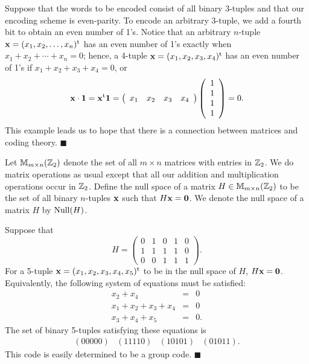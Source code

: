  
Suppose that the words to be encoded consist of all binary
\mbox{3-tuples}
and that our encoding scheme is even-parity. To encode an arbitrary
3-tuple, we add a fourth bit to obtain an even number of 1's. Notice
that an arbitrary $n$-tuple ${\bold x} = (x_1, x_2, \ldots, x_n)^{\rm
t}$ has an even number of 1's exactly when $x_1 + x_2 + \cdots + x_n =
0$; hence, a 4-tuple ${\bold x} = (x_1, x_2, x_3, x_4)^{\rm t}$ has an
even number of 1's if $ x_1+ x_2+ x_3+ x_4 = 0$, or 
\[
{\bold x} \cdot {\bold 1} 
= 
{\bold x}^{\rm t} {\bold 1} 
=
\left(
\begin{array}{cccc}
x_1 & x_2 & x_3 & x_4
\end{array}
\right)
\left(
\begin{array}{c}
1 \\
1 \\
1 \\
1
\end{array}
\right) = 0.
\]
This example leads us to hope that there is a connection between
matrices and coding theory. 
\hspace{\fill} $\blacksquare$
 
 
\vspace{2ex}
 
 
Let ${\Bbb M}_{m \times n}({\Bbb Z}_2)$\label{notembyn} denote the set
of all $m \times n$ matrices with entries in ${\Bbb Z}_2$. We do
matrix operations as usual except that all our addition and multiplication
operations occur in ${\Bbb Z}_2$. Define the {\bfi null
space\/} of 
a matrix $H \in {\Bbb M}_{m \times n}({\Bbb Z}_2)$ to be the set of
all binary $n$-tuples ${\bold x}$ such that $H{\bold x} = {\bold 0}$.
We denote the null space of a matrix $H$ by ${\rm Null}(H)$\label{notenull}.  
 
 
\vspace{2ex}
 
 
Suppose that
\[
H =
\left(
\begin{array}{ccccc}
0 & 1 & 0 & 1 & 0 \\
1 & 1 & 1 & 1 & 0 \\
0 & 0 & 1 & 1 & 1
\end{array}
\right).
\]
For a 5-tuple ${\bold x} = (x_1, x_2, x_3, x_4, x_5)^{\rm t}$ to be in
the null space of $H$, $H{\bold x} = {\bold 0}$. Equivalently, the
following system of equations must be satisfied:   
\begin{eqnarray*}
 x_2 + x_4   & = & 0 \\
x_1 + x_2 + x_3 + x_4  & = & 0 \\
 x_3 + x_4 + x_5 & = & 0.
\end{eqnarray*}
The set of binary 5-tuples satisfying these equations is
\[
\begin{array}{cccc}
(00000) & (11110) & (10101) & (01011).
\end{array}
\]
This code is easily determined to be a group code.
\hspace{\fill} $\blacksquare$
 

